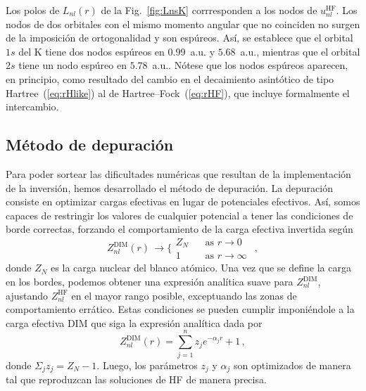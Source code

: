Los polos de $L_{nl}(r)$ de la Fig.~\ref{fig:LnsK} corrresponden a los 
nodos de $u_{nl}^{\mathrm{HF}}$. Los nodos de dos orbitales con el mismo 
momento angular que no coinciden no surgen de la imposición de 
ortogonalidad y son espúreos. Así, se establece que el orbital $1s$ del 
K tiene dos nodos espúreos en $0.99$~a.u. y $5.68$~a.u., mientras que el 
orbital $2s$ tiene un nodo espúreo en $5.78$~a.u.. Nótese que los nodos 
espúreos aparecen, en principio, como resultado del cambio en el 
decaimiento asintótico de tipo Hartree~(\ref{eq:rHlike}) al de 
Hartree--Fock~(\ref{eq:rHF}), que incluye formalmente el intercambio.

\subsection{Método de depuración}
\label{subsec:depuracion}

Para poder sortear las dificultades numéricas que resultan de la 
implementación de la inversión, hemos desarrollado el método de 
depuración. La depuración consiste en optimizar cargas efectivas en 
lugar de potenciales efectivos. Así, somos capaces de restringir los 
valores de cualquier potencial a tener las condiciones de borde 
correctas, forzando el comportamiento de la carga efectiva invertida 
según
\begin{equation}
Z_{nl}^{\mathrm{DIM}}(r) \, \rightarrow 
\bigg\{ 
\begin{array}{ll}
Z_{N}  \ \  & \ \ \text{as\ \ }r  \rightarrow 0\  \\ 
1           & \ \ \text{as\ \ }r  \rightarrow \infty \ 
\end{array}\,,
\label{eq:Zasympt}
\end{equation}
donde $Z_N$ es la carga nuclear del blanco atómico. Una vez que se 
define la carga en los bordes, podemos obtener una expresión analítica
suave para $Z_{nl}^{\mathrm{DIM}}$, ajustando $Z_{nl}^{\mathrm{HF}}$ en
el mayor rango posible, exceptuando las zonas de comportamiento errático.
Estas condiciones se pueden cumplir imponiéndole a la carga efectiva 
DIM que siga la expresión analítica dada por
\begin{equation}
Z_{nl}^{\mathrm{DIM}}(r)= \sum_{j=1}^{n} z_j e^{-\alpha_j r}+1 \,,
\label{eq:atomzDIM}
\end{equation}
donde $\Sigma_j z_j=Z_N-1$. Luego, los parámetros $z_j$ y $\alpha_j$ 
son optimizados de manera tal que reproduzcan las soluciones de HF de 
manera precisa.

